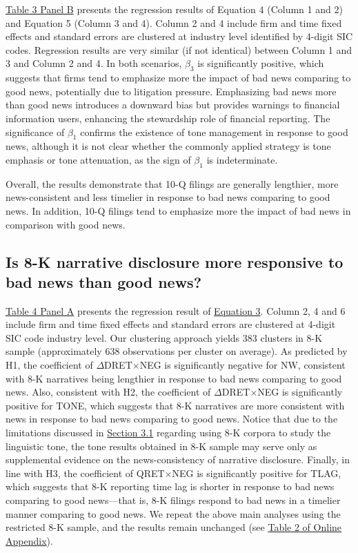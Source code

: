 \documentclass[a4paper]{article}
\begin{document}
\begin{spacing}{2}
\hyperref[T3PB]{Table 3 Panel B} presents the regression results of Equation 4 (Column 1 and 2) and Equation 5 (Column 3 and 4). Column 2 and 4 include firm and time fixed effects and standard errors are clustered at industry level identified by 4-digit SIC codes. Regression results are very similar (if not identical) between Column 1 and 3 and Column 2 and 4. In both scenarios, $\beta_3$ is significantly positive, which suggests that firms tend to emphasize more the impact of bad news comparing to good news, potentially due to litigation pressure. Emphasizing bad news more than good news introduces a downward bias but provides warnings to financial information users, enhancing the stewardship role of financial reporting. The significance of $\beta_1$ confirms the existence of tone management in response to good news, although it is not clear whether the commonly applied strategy is tone emphasis or tone attenuation, as the sign of $\beta_1$ is indeterminate.

Overall, the results demonstrate that 10-Q filings are generally lengthier, more news-consistent and less timelier in response to bad news comparing to good news. In addition, 10-Q filings tend to emphasize more the impact of bad news in comparison with good news. 

\subsection{Is 8-K narrative disclosure more responsive to bad news than good news?}
\hyperref[T4PA]{Table 4 Panel A} presents the regression result of \hyperref[eq3]{Equation 3}. Column 2, 4 and 6 include firm and time fixed effects and standard errors are clustered at 4-digit SIC code industry level. Our clustering approach yields 383 clusters in 8-K sample (approximately 638 observations per cluster on average). As predicted by H1, the coefficient of $\Delta$DRET$\times$NEG is significantly negative for NW, consistent with 8-K narratives being lengthier in response to bad news comparing to good news. Also, consistent with H2, the coefficient of $\Delta$DRET$\times$NEG is significantly positive for TONE, which suggests that 8-K narratives are more consistent with news in response to bad news comparing to good news. Notice that due to the limitations discussed in \hyperref[sec3.1]{Section 3.1} regarding using 8-K corpora to study the linguistic tone, the tone results obtained in 8-K sample may serve only as supplemental evidence on the news-consistency of narrative disclosure. Finally, in line with H3, the coefficient of QRET$\times$NEG is significantly positive for TLAG, which suggests that 8-K reporting time lag is shorter in response to bad news comparing to good news---that is, 8-K filings respond to bad news in a timelier manner comparing to good news. We repeat the above main analyses using the restricted 8-K sample, and the results remain unchanged (see \hyperref[oat2]{Table 2 of Online Appendix}).


\end{spacing}
\end{document}
